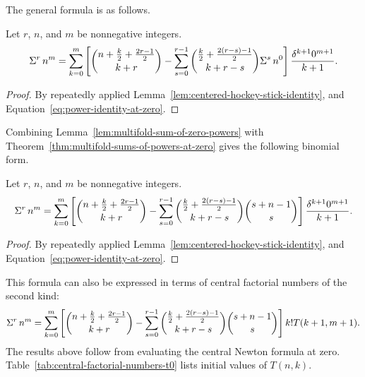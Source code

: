 The general formula is as follows.
\begin{theorem}
  \label{thm:multifold-sums-of-powers-at-zero}
  Let $r$, $n$, and $m$ be nonnegative integers.
  \begin{align*}
    \Sigma^{r}\,{n}^{m}
    =
    \sum_{k=0}^{m}
    \left[
      \binom{n+\frac{k}{2}+\frac{2r-1}{2}}{k+r}
      -
      \sum_{s=0}^{r-1} \binom{\frac{k}{2} + \frac{2(r-s)-1}{2}}{k+r-s}
      \Sigma^{s}\,{n}^{0}
    \right] \frac{\delta^{k+1} 0^{m+1}}{k+1}.
  \end{align*}
  \begin{proof}
    By repeatedly applied Lemma~\eqref{lem:centered-hockey-stick-identity},
    and Equation~\eqref{eq:power-identity-at-zero}.
  \end{proof}
\end{theorem}
Combining Lemma~\eqref{lem:multifold-sum-of-zero-powers} with Theorem~\eqref{thm:multifold-sums-of-powers-at-zero} gives the following binomial form.
\begin{proposition}
  \label{prop:multifold-sums-of-powers-at-zero-binomial-form}
  Let $r$, $n$, and $m$ be nonnegative integers.
  \begin{align*}
    \Sigma^{r}\,{n}^{m}
    =
    \sum_{k=0}^{m}
    \left[
      \binom{n+\frac{k}{2}+\frac{2r-1}{2}}{k+r}
      -
      \sum_{s=0}^{r-1} \binom{\frac{k}{2} + \frac{2(r-s)-1}{2}}{k+r-s}
      \binom{s+n-1}{s}
    \right] \frac{\delta^{k+1} 0^{m+1}}{k+1}.
  \end{align*}
  \begin{proof}
    By repeatedly applied Lemma~\eqref{lem:centered-hockey-stick-identity},
    and Equation~\eqref{eq:power-identity-at-zero}.
  \end{proof}
\end{proposition}
This formula can also be expressed in terms of central factorial numbers of the second kind:
\begin{align*}
  \Sigma^{r}\,{n}^{m}
  =
  \sum_{k=0}^{m}
  \left[
    \binom{n+\frac{k}{2}+\frac{2r-1}{2}}{k+r}
    -
    \sum_{s=0}^{r-1} \binom{\frac{k}{2} + \frac{2(r-s)-1}{2}}{k+r-s}
    \binom{s+n-1}{s}
  \right] k! T(k+1, m+1).
\end{align*}
The results above follow from evaluating the central Newton formula at zero.
Table~\ref{tab:central-factorial-numbers-t0} lists initial values of $T(n,k)$.

